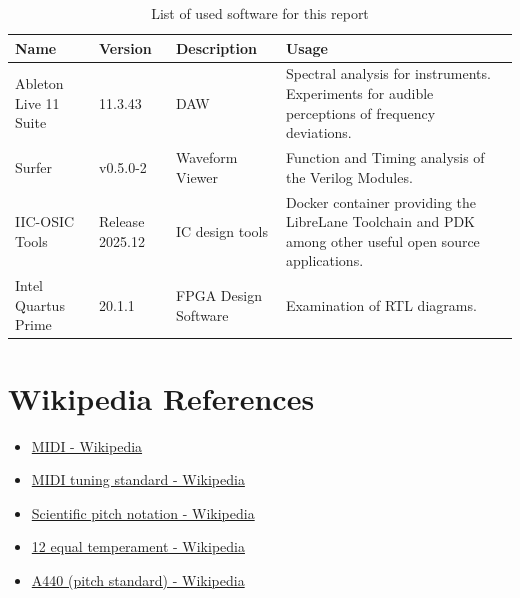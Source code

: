 \documentclass[
	a4paper,
	oneside,
	11pt,
	english
]{scrartcl}
\begin{document}
\begin{table}[h]
	\caption{List of used software for this report}\label{tab:sw}
	\begin{tabularx}{\textwidth}{
		p{}
		p{}
		p{}
		p{}@{}
		}
		\toprule
		Name                  & Version         & Description          & Usage                                                                                                   \\ \midrule
		Ableton Live 11 Suite & 11.3.43         & \ac{DAW}             & Spectral analysis for instruments. Experiments for audible perceptions of frequency deviations.         \\
		Surfer                & v0.5.0-2        & Waveform Viewer      & Function and Timing analysis of the Verilog Modules.                                                    \\
		IIC-OSIC Tools        & Release 2025.12 & IC design tools      & Docker container providing the LibreLane Toolchain and PDK among other useful open source applications. \\
		Intel Quartus Prime   & 20.1.1          & FPGA Design Software & Examination of RTL diagrams.                                                                            \\
		\bottomrule
	\end{tabularx}
\end{table}

\section{Wikipedia References}

\begin{itemize}[label=\faWikipediaW]
	\item \href{https://en.wikipedia.org/wiki/MIDI}{MIDI - Wikipedia}
	\item \href{https://en.wikipedia.org/wiki/MIDI_tuning_standard}{MIDI tuning standard - Wikipedia}
	\item \href{https://en.wikipedia.org/wiki/Scientific_pitch_notation}{Scientific pitch notation - Wikipedia}
	\item \href{https://en.wikipedia.org/wiki/12_equal_temperament}{12 equal temperament - Wikipedia}
	\item \href{https://en.wikipedia.org/wiki/A440_(pitch_standard)}{A440 (pitch standard) - Wikipedia}
\end{itemize}

\newpage

\end{document}

